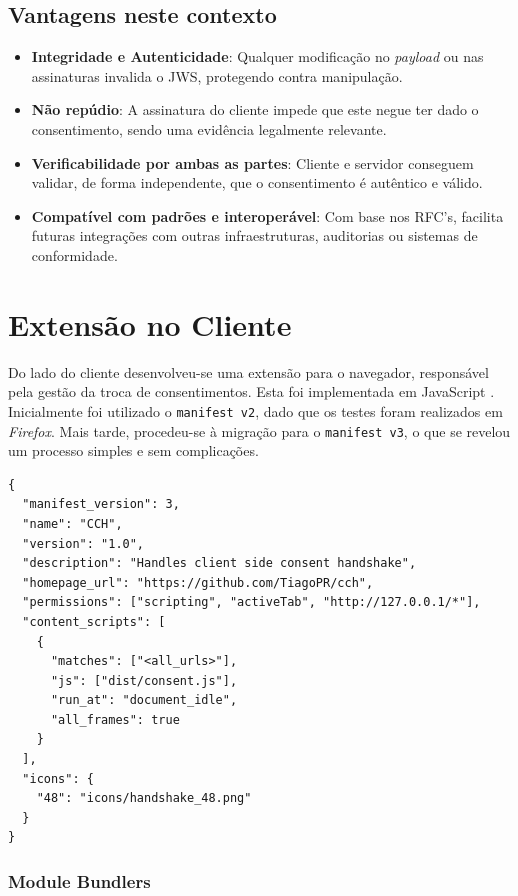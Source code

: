 \subsection{Vantagens neste contexto}

\begin{itemize}
  \item \textbf{Integridade e Autenticidade}: Qualquer modificação no \textit{payload} ou nas assinaturas invalida o JWS, protegendo contra manipulação.
  \item \textbf{Não repúdio}: A assinatura do cliente impede que este negue ter dado o consentimento, sendo uma evidência legalmente relevante.
  \item \textbf{Verificabilidade por ambas as partes}: Cliente e servidor conseguem validar, de forma independente, que o consentimento é autêntico e válido.
  \item \textbf{Compatível com padrões e interoperável}: Com base nos RFC’s, facilita futuras integrações com outras infraestruturas, auditorias ou sistemas de conformidade.
\end{itemize}

\section{Extensão no Cliente}
Do lado do cliente desenvolveu-se uma extensão para o navegador, responsável pela gestão da troca de consentimentos. Esta foi implementada em JavaScript \citep{MozillaBrowserExtensions}. Inicialmente foi utilizado o \texttt{manifest v2}, dado que os testes foram realizados em \textit{Firefox}. Mais tarde, procedeu-se à migração para o \texttt{manifest v3}, o que se revelou um processo simples e sem complicações.

\begin{verbatim}
{
  "manifest_version": 3,
  "name": "CCH",
  "version": "1.0",
  "description": "Handles client side consent handshake",
  "homepage_url": "https://github.com/TiagoPR/cch",
  "permissions": ["scripting", "activeTab", "http://127.0.0.1/*"],
  "content_scripts": [
    {
      "matches": ["<all_urls>"],
      "js": ["dist/consent.js"],
      "run_at": "document_idle",
      "all_frames": true
    }
  ],
  "icons": {
    "48": "icons/handshake_48.png"
  }
}
\end{verbatim}

\subsubsection{Module Bundlers}

